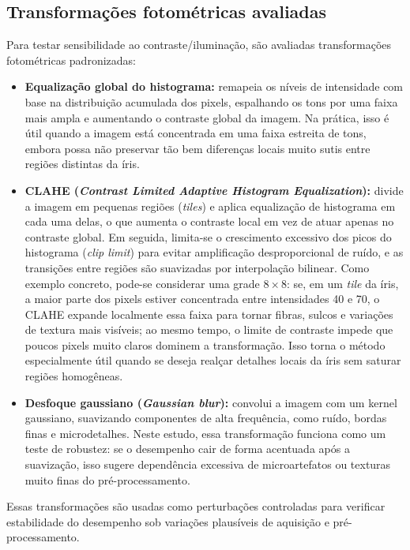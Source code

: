\documentclass[12pt,a4paper]{article}
\begin{document}
\subsection{Transformações fotométricas avaliadas}
\label{ref:transformacoes}
Para testar sensibilidade ao contraste/iluminação, são avaliadas transformações fotométricas padronizadas:
\begin{itemize}
    \item \textbf{Equalização global do histograma:} remapeia os níveis de intensidade com base na distribuição acumulada dos pixels, espalhando os tons por uma faixa mais ampla e aumentando o contraste global da imagem. Na prática, isso é útil quando a imagem está concentrada em uma faixa estreita de tons, embora possa não preservar tão bem diferenças locais muito sutis entre regiões distintas da íris. \citep{OpenCVHistEq}

    \item \textbf{CLAHE (\textit{Contrast Limited Adaptive Histogram Equalization}):} divide a imagem em pequenas regiões (\textit{tiles}) e aplica equalização de histograma em cada uma delas, o que aumenta o contraste local em vez de atuar apenas no contraste global. Em seguida, limita-se o crescimento excessivo dos picos do histograma (\textit{clip limit}) para evitar amplificação desproporcional de ruído, e as transições entre regiões são suavizadas por interpolação bilinear. Como exemplo concreto, pode-se considerar uma grade \(8\times 8\): se, em um \textit{tile} da íris, a maior parte dos pixels estiver concentrada entre intensidades 40 e 70, o CLAHE expande localmente essa faixa para tornar fibras, sulcos e variações de textura mais visíveis; ao mesmo tempo, o limite de contraste impede que poucos pixels muito claros dominem a transformação. Isso torna o método especialmente útil quando se deseja realçar detalhes locais da íris sem saturar regiões homogêneas. \citep{Zuiderveld1994CLAHE,OpenCVHistEq}

    \item \textbf{Desfoque gaussiano (\textit{Gaussian blur}):} convolui a imagem com um kernel gaussiano, suavizando componentes de alta frequência, como ruído, bordas finas e microdetalhes. Neste estudo, essa transformação funciona como um teste de robustez: se o desempenho cair de forma acentuada após a suavização, isso sugere dependência excessiva de microartefatos ou texturas muito finas do pré-processamento. \citep{OpenCVSmoothing}
\end{itemize}

Essas transformações são usadas como perturbações controladas para verificar estabilidade do desempenho sob variações plausíveis de aquisição e pré-processamento.
\end{document}
